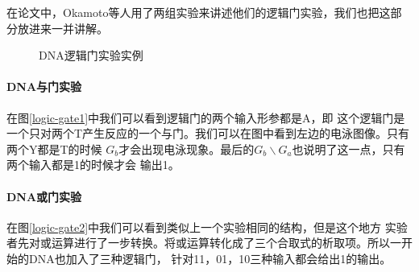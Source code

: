 \documentclass[a4paper,twoside]{article}
\begin{document}
\newpage
在论文中，Okamoto等人用了两组实验来讲述他们的逻辑门实验，我们也把这部分放进来一并讲解。
\begin{figure}[htbp]
	\centering
	\caption{DNA逻辑门实验实例}
	\label{logic-gate-exper}
\end{figure}

\paragraph{DNA与门实验}在图\ref{logic-gate1}中我们可以看到逻辑门的两个输入形参都是A，即
这个逻辑门是一个只对两个T产生反应的一个与门。我们可以在图中看到左边的电泳图像。只有两个Y都是T的时候
$G_b$才会出现电泳现象。最后的$G_b \backslash G_a$也说明了这一点，只有两个输入都是1的时候才会
输出1。

\paragraph{DNA或门实验}在图\ref{logic-gate2}中我们可以看到类似上一个实验相同的结构，但是这个地方
实验者先对或运算进行了一步转换。将或运算转化成了三个合取式的析取项。所以一开始的DNA也加入了三种逻辑门，
针对11，01，10三种输入都会给出1的输出。
\end{document}
